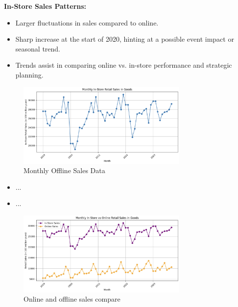 \documentclass{beamer}
\begin{document}
\textbf{In-Store Sales Patterns:}
\begin{itemize}
    \item Larger fluctuations in sales compared to online.
    \item Sharp increase at the start of 2020, hinting at a possible event impact or seasonal trend.
    \item Trends assist in comparing online vs. in-store performance and strategic planning.
\end{itemize}
\begin{figure}
    \centering
    \includegraphics[width=0.75\textwidth]{offline_sales_data.png}
    \caption{Monthly Offline Sales Data}
\end{figure}


\begin{itemize}
    \item ...
    \item ...
\end{itemize}

\begin{figure}
    \centering
    \includegraphics[width=0.75\textwidth]{online_instore_compare.jpg}
    \caption{Online and offline sales compare}
    \end{figure}
\end{document}
